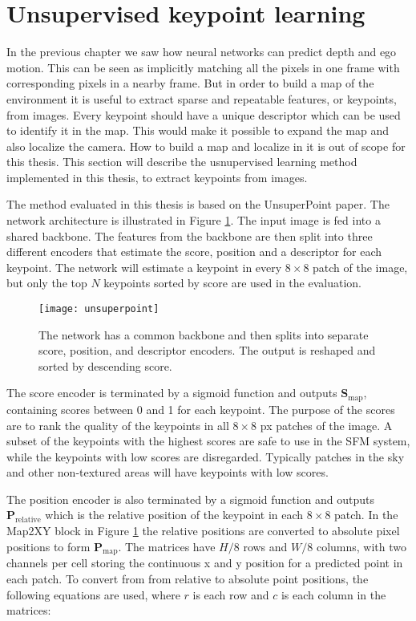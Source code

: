 \section{Unsupervised keypoint learning}

In the previous chapter we saw how neural networks can predict depth and ego motion. This can be seen as implicitly matching all the pixels in one frame with corresponding pixels in a nearby frame. But in order to build a map of the environment it is useful to extract sparse and repeatable features, or keypoints, from images. Every keypoint should have a unique descriptor which can be used to identify it in the map. This would make it possible to expand the map and also localize the camera. How to build a map and localize in it is out of scope for this thesis. This section will describe the usnupervised learning method implemented in this thesis, to extract keypoints from images.

The method evaluated in this thesis is based on the UnsuperPoint paper\cite{unsuperpoint}. The network architecture is illustrated in Figure \ref{fig:unsuperpoint}. The input image is fed into a shared backbone. The features from the backbone are then split into three different encoders that estimate the score, position and a descriptor for each keypoint. The network will estimate a keypoint in every $8\times 8$ patch of the image, but only the top $N$ keypoints sorted by score are used in the evaluation.

\begin{figure}[H]
	\centering
	\texttt{[image: unsuperpoint]}
	\caption{The network has a common backbone and then splits into separate score, position, and descriptor encoders. The output is reshaped and sorted by descending score.}
	\label{fig:unsuperpoint}
\end{figure}

The score encoder is terminated by a sigmoid function and outputs $\textbf{S}_{\mathrm{map}}$, containing scores between 0 and 1 for each keypoint. The purpose of the scores are to rank the quality of the keypoints in all $8\times 8$ px patches of the image. A subset of the keypoints with the highest scores are safe to use in the SFM system, while the keypoints with low scores are disregarded. Typically patches in the sky and other non-textured areas will have keypoints with low scores.

The position encoder is also terminated by a sigmoid function and outputs $\textbf{P}_{\textrm{relative}}$ which is the relative position of the keypoint in each $8 \times 8$ patch. In the Map2XY block in Figure \ref{fig:unsuperpoint} the relative positions are converted to absolute pixel positions to form $\textbf{P}_{\textrm{map}}$. The matrices have $H/8$ rows and $W/8$ columns, with two channels per cell storing the continuous x and y position for a predicted point in each patch. To convert from from relative to absolute point positions, the following equations are used, where $r$ is each row and $c$ is each column in the matrices:

